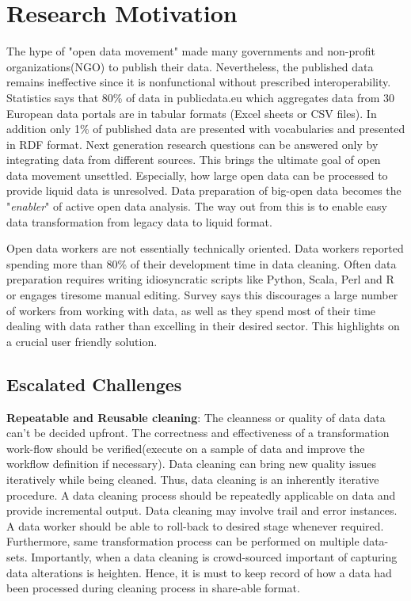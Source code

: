 \section{Research Motivation}
The hype of "open data movement" made many governments and non-profit organizations(NGO) to publish their data. Nevertheless, the published data remains ineffective since it is nonfunctional without prescribed interoperability. Statistics says that 80\% of data in publicdata.eu which aggregates data from 30 European data portals are in tabular formats (Excel sheets or CSV files)\cite{nemreport}. In addition only 1\% of published data are presented with vocabularies and presented in RDF format\cite{nemreport}. Next generation research questions can be answered only by integrating data from different sources\cite{nemreport}. This brings the ultimate goal of open data movement unsettled. Especially, how large open data can be processed to provide liquid data is unresolved. Data preparation of big-open data becomes the "\textit{enabler}" of active open data analysis. The way out from this is to enable easy data transformation from legacy data to liquid format. 

\noindent  Open data workers are not essentially technically oriented. Data workers reported spending more than 80\% of their development time in data cleaning\cite{visualizationsandtransformationsinwrangling}\cite{Wisteria}\cite{journals/corr/KrishnanW0FG16}. Often data preparation requires writing idiosyncratic scripts like Python, Scala, Perl and R or engages tiresome manual editing. Survey says this discourages a large number of workers from working with data, as well as they spend most of their time dealing with data rather than excelling in their desired sector\cite{visualizationsandtransformationsinwrangling}. This highlights on a crucial user friendly solution.

\subsection{Escalated Challenges}
\textbf{Repeatable and Reusable cleaning}: The cleanness or quality of data data can't be decided upfront. The correctness and effectiveness of a transformation work-flow should be verified(execute on a sample of data and improve the workflow definition if necessary). Data cleaning can bring new quality issues iteratively while being cleaned. Thus, data cleaning is an inherently iterative procedure\cite{Wisteria}. A data cleaning process should be repeatedly applicable on data and provide incremental output. Data cleaning may involve trail and error instances\cite{visualizationsandtransformationsinwrangling}. A data worker should be able to roll-back to desired stage whenever required. Furthermore, same transformation process can be performed on multiple data-sets. Importantly, when a data cleaning is crowd-sourced important of capturing data alterations is heighten\cite{2011-wrangler}.  Hence, it is must to keep record of how a data had been processed during cleaning process in share-able format. 

